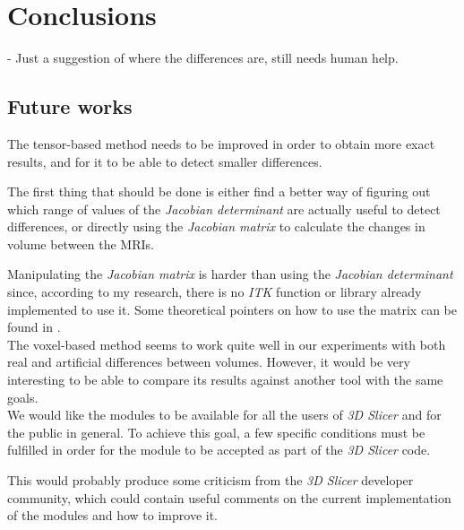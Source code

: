 \chapter{Conclusions}

- Just a suggestion of where the differences are, still needs human help.



\section{Future works}

The tensor-based method needs to be improved in order to obtain more
exact results, and for it to be able to detect smaller differences.

The first thing that should be done is either find a better way of
figuring out which range of values of the \textit{Jacobian
  determinant} are actually useful to detect differences, or directly
using the \textit{Jacobian matrix} to calculate the changes in volume
between the MRIs.

Manipulating the \textit{Jacobian matrix} is harder than using the
\textit{Jacobian determinant} since, according to my research, there
is no \textit{ITK} function or library already implemented to use
it. Some theoretical pointers on how to use the matrix can be found in
\cite{ashburner}.\\

The voxel-based method seems to work quite well in our experiments
with both real and artificial differences between volumes. However, it
would be very interesting to be able to compare its results against
another tool with the same goals.\\

We would like the modules to be available for all the users of
\textit{3D Slicer} and for the public in general. To achieve this
goal, a few specific conditions must be fulfilled in order for the
module to be accepted as part of the \textit{3D Slicer} code.

This would probably produce some criticism from the \textit{3D Slicer}
developer community, which could contain useful comments on the
current implementation of the modules and how to improve it.\\


